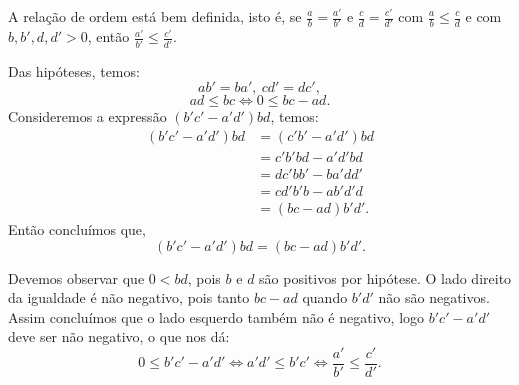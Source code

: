 \documentclass[../main.tex]{subfiles}
\begin{document}
\begin{prop}\label{rac-prop-relOrdemBemDef}
    A relação de ordem está bem definida, isto é, se $\frac{a}{b} = \frac{a'}{b'}$ e $\frac{c}{d} = \frac{c'}{d'}$ com 
    $\frac{a}{b} \leq \frac{c}{d}$ e com $b,b',d,d' > 0$, então $\frac{a'}{b'} \leq \frac{c'}{d'}$.
\end{prop}
\begin{dem}
    Das hipóteses, temos: \\
    \[ ab' = ba',\ cd' = dc', \] 
    \[ ad \leq bc \iff 0 \leq bc-ad. \]
    Consideremos a expressão $(b'c'-a'd')bd$, temos: 
    \begin{align*}
        (b'c'-a'd')bd 
        &= (c'b'-a'd')bd  \\
        &= c'b'bd - a'd'bd \\
        &= dc'bb' - ba'dd' \\
        &= cd'b'b - ab'd'd \\
        &= (bc-ad) b'd'.     
    \end{align*}
    Então concluímos que, 
    \[ (b'c'-a'd')bd = (bc-ad) b'd'. \]

    Devemos observar que $0 < bd$, pois $b$ e $d$ são positivos por hipótese. O lado direito da igualdade é não negativo, pois 
    tanto $bc-ad$ quando $b'd'$ não são negativos. Assim concluímos que o lado esquerdo também não é negativo, logo $b'c'-a'd'$ deve ser não negativo, o que nos dá:
    \[ 0 \leq b'c'-a'd' \iff a'd' \leq b'c' \iff \frac{a'}{b'} \leq \frac{c'}{d'}. \]

    
    
    
\end{dem}
\end{document}
